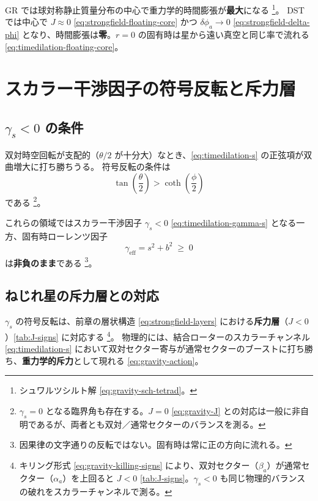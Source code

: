 \documentclass[dvipdfmx,a4paper,oneside]{jsbook}
\numberwithin{equation}{chapter}
\begin{document}
GR では球対称静止質量分布の中心で重力学的時間膨張が\textbf{最大}になる \footnote{シュワルツシルト解 \eqref{eq:gravity-sch-tetrad}。}。
DST では中心で \(J \approx 0\) \eqref{eq:strongfield-floating-core} かつ \(\delta\phi_a \to 0\) \eqref{eq:strongfield-delta-phi} となり、時間膨張は\textbf{零}。\(r = 0\) の固有時は星から遠い真空と同じ率で流れる \eqref{eq:timedilation-floating-core}。

\section{スカラー干渉因子の符号反転と斥力層}

\subsection{\(\gamma_s < 0\) の条件}

双対時空回転が支配的（\(\theta/2\) が十分大）なとき、\eqref{eq:timedilation-s} の正弦項が双曲増大に打ち勝ちうる。
符号反転の条件は
\begin{equation}
  \tan\!\left(\frac{\theta}{2}\right) > \coth\!\left(\frac{\phi}{2}\right)
  \label{eq:timedilation-gamma-s-negative}
\end{equation}
である \footnote{\(\gamma_s = 0\) となる臨界角も存在する。\(J = 0\) \eqref{eq:gravity-J} との対応は一般に非自明であるが、両者とも双対／通常セクターのバランスを測る。}。

これらの領域ではスカラー干渉因子 \(\gamma_s < 0\) \eqref{eq:timedilation-gamma-s} となる一方、固有時ローレンツ因子
\begin{equation}
  \gamma_{\mathrm{eff}} = s^2 + b^2 \;\geq\; 0
  \label{eq:timedilation-gamma-eff-nonneg}
\end{equation}
は\textbf{非負のまま}である \footnote{因果律の文字通りの反転ではない。固有時は常に正の方向に流れる。}。

\subsection{ねじれ星の斥力層との対応}

\(\gamma_s\) の符号反転は、前章の層状構造 \eqref{eq:strongfield-layers} における\textbf{斥力層}（\(J < 0\)）\eqref{tab:J-signs} に対応する \footnote{キリング形式 \eqref{eq:gravity-killing-signs} により、双対セクター（\(\beta_a\)）が通常セクター（\(\alpha_a\)）を上回ると \(J < 0\) \eqref{tab:J-signs}。\(\gamma_s < 0\) も同じ物理的バランスの破れをスカラーチャンネルで測る。}。
物理的には、結合ローターのスカラーチャンネル \eqref{eq:timedilation-s} において双対セクター寄与が通常セクターのブーストに打ち勝ち、\textbf{重力学的斥力}として現れる \eqref{eq:gravity-action}。
\end{document}
